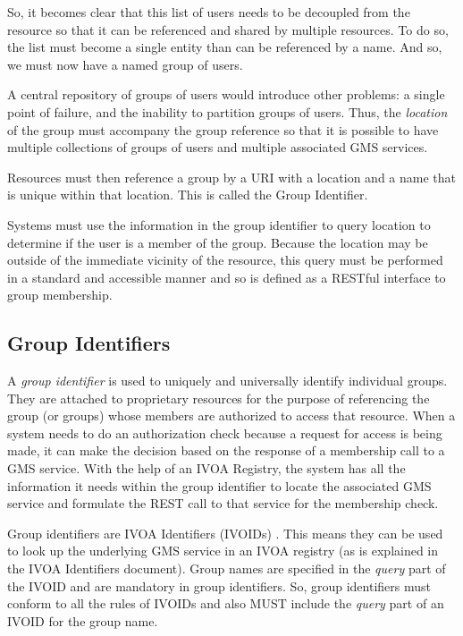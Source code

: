 \documentclass[11pt,a4paper]{ivoa}
\begin{document}
So, it becomes clear that this list of users needs to be decoupled from the resource so that it can be referenced and shared by multiple resources.  To do so, the list must become a single entity than can be referenced by a name.  And so, we must now have a named group of users.

A central repository of groups of users would introduce other problems:  a single point of failure, and the inability to partition groups of users.  Thus, the \emph{location} of the group must accompany the group reference so that it is possible to have multiple collections of groups of users and multiple associated GMS services.

Resources must then reference a group by a URI with a location and a name that is unique within that location.  This is called the Group Identifier.

Systems must use the information in the group identifier to query location to determine if the user is a member of the group.  Because the location may be outside of the immediate vicinity of the resource, this query must be performed in a standard and accessible manner and so is defined as a RESTful interface to group membership.

\subsection{Group Identifiers}

A \emph{group identifier} is used to uniquely and universally identify individual groups.  They are attached to proprietary resources for the purpose of referencing the group (or groups) whose members are authorized to access that resource.  When a system needs to do an authorization check because a request for access is being made, it can make the decision based on the response of a membership call to a GMS service.  With the help of an IVOA Registry, the system has all the information it needs within the group identifier to locate the associated GMS service and formulate the REST call to that service for the membership check.

Group identifiers are IVOA Identifiers (IVOIDs) \citep{2016ivoa.spec.0523D}.  This means they can be used to look up the underlying GMS service in an IVOA registry (as is explained in the IVOA Identifiers document).  Group names are specified in the \emph{query} part of the IVOID and are mandatory in group identifiers.  So, group identifiers must conform to all the rules of IVOIDs and also MUST include the \emph{query} part of an IVOID for the group name.
\end{document}
